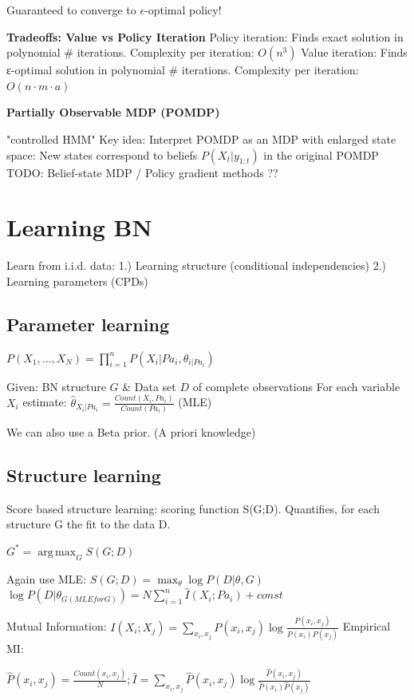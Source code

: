 \documentclass[a4paper, 11pt, landscape]{article}
\DeclareMathOperator*{\argmax}{arg\,max}
\begin{document}
\begin{multicols*}{3}
Guaranteed to converge to $\epsilon$-optimal policy!

\textbf{Tradeoffs: Value vs Policy Iteration}
Policy iteration: Finds exact solution in polynomial \# iterations. Complexity per iteration: $O(n^3)$
Value iteration: Finds ε-optimal solution in polynomial \# iterations. Complexity per iteration: $O(n\cdot m \cdot a)$

\textbf{Partially Observable MDP (POMDP)}

"controlled HMM"
Key idea: Interpret POMDP as an MDP with enlarged state space: New states correspond to beliefs $P(X_t | y_{1:t})$ in the original POMDP
TODO: Belief-state MDP / Policy gradient methods ??

\section{Learning BN}
Learn from i.i.d. data: 1.) Learning structure (conditional independencies) 2.) Learning parameters (CPDs)

\subsection{Parameter learning} 

$P(X_1, ..., X_N) = \prod_{i=1}^{n} P(X_i | Pa_i, {\theta}_{i | Pa_i})$

Given:  BN structure $G$ \& Data set $D$ of complete observations
For each variable $X_i$ estimate: $\hat{\theta}_{X_i | Pa_i} = \frac{Count(X_i , Pa_i)}{Count(Pa_i)}$ (MLE)

We can also use a Beta prior. (A priori knowledge)

\subsection{Structure learning}

Score based structure learning: scoring function S(G;D). Quantifies, for each structure G the fit to the data D. 

$G^* = \argmax_G S(G;D)$

Again use MLE: $S(G;D) = \max_\theta \log P(D | \theta, G)$
$\log P(D | \theta_{G (MLE for G)}) = N \sum_{i=1}^{n} \hat{I}(X_i ; Pa_i) + const$

Mutual Information: $I(X_i; X_j) = \sum_{x_i, x_j} P(x_i, x_j) \log \frac{P(x_i, x_j)}{P(x_i) P(x_j)}$
Empirical MI: 

$\hat{P}(x_i, x_j) = \frac{Count(x_i, x_j)}{N}; \hat{I} = \sum_{x_i, x_j} \hat{P}(x_i, x_j) \log \frac{\hat{P}(x_i, x_j)}{\hat{P}(x_i) \hat{P}(x_j)}$


\end{multicols*}
\end{document}
